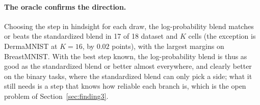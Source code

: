 \paragraph{The oracle confirms the direction.}
Choosing the step in hindsight for each draw, the log-probability blend matches or beats the standardized blend in 17 of 18 dataset and $K$ cells
(the exception is DermaMNIST at $K = 16$, by $0.02$ points), with the largest margins on BreastMNIST.
With the best step known, the log-probability blend is thus as good as the standardized blend or better almost everywhere,
and clearly better on the binary tasks, where the standardized blend can only pick a side;
what it still needs is a step that knows how reliable each branch is, which is the open problem of Section~\ref{sec:finding3}.
